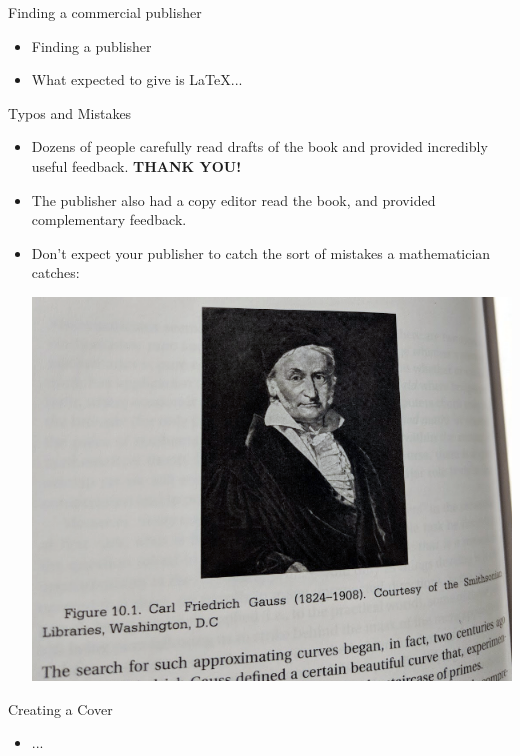 \documentclass{beamer}
\begin{document}
\begin{frame}{Finding a commercial publisher}
  \begin{itemize}
    \item Finding a publisher
    \item What expected to give is \LaTeX{}...
  \end{itemize}
\end{frame}


\begin{frame}{Typos and Mistakes}
  \begin{itemize}
    \item Dozens of people carefully read drafts of
          the book and provided incredibly useful feedback.
          \textbf{THANK YOU!}
    \item The publisher also had a copy editor read the book,
          and provided complementary feedback.
    \item Don't expect your publisher to catch the sort of
          mistakes a mathematician catches:
          \begin{center}
            \includegraphics[height=.45\textheight]{pics/gauss.png}
          \end{center}
  \end{itemize}
\end{frame}


\begin{frame}{Creating a Cover}
  \begin{itemize}
    \item ...
  \end{itemize}
\end{frame}
\end{document}
